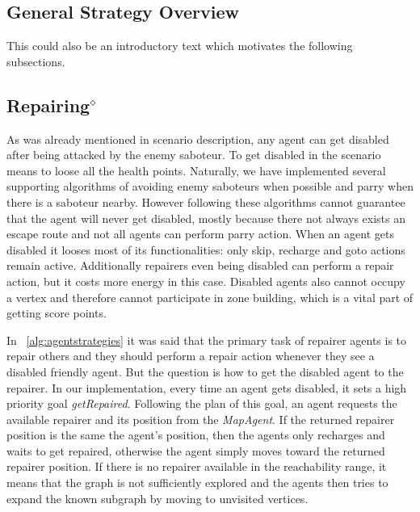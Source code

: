 \subsection{General Strategy Overview}
This could also be an introductory text which motivates the following subsections.



\subsection[Repairing]{Repairing$^\diamond$}\label{alg:repairing}
As was already mentioned in scenario description, any agent can get disabled after being attacked by the enemy saboteur. To get disabled in the scenario means to loose all the health points. Naturally, we have implemented several supporting algorithms of avoiding enemy saboteurs when possible and parry when there is a saboteur nearby. However following these algorithms cannot guarantee that the agent will never get disabled, mostly because there not always exists an escape route and not all agents can perform parry action. When an agent gets disabled it looses most of its functionalities: only skip, recharge and goto actions remain active. Additionally repairers even being disabled can perform a repair action, but it costs more energy in this case. Disabled agents also cannot occupy a vertex and therefore cannot participate in zone building, which is a vital part of getting score points.

In ~\autoref{alg:agentstrategies} it was said that the primary task of repairer agents is to repair others and they should perform a repair action whenever they see a disabled friendly agent. But the question is how to get the disabled agent to the repairer. In our implementation, every time an agent gets disabled, it sets a high priority goal \emph{getRepaired}. Following the plan of this goal, an agent requests the available repairer and its position from the \emph{MapAgent}. If the returned repairer position is the same the agent's position, then the agents only recharges and waits to get repaired, otherwise the agent simply moves toward the returned repairer position. If there is no repairer available in the reachability range, it means that the graph is not sufficiently explored and the agents then tries to expand the known subgraph by moving to unvisited vertices.

